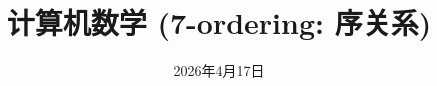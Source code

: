 \documentclass[a4paper, justified]{tufte-handout}
\title{计算机数学 (7-ordering: 序关系)}
\date{2026年4月17日}
\begin{document}
\maketitle
\noplagiarism %
\begin{abstract}
\end{abstract}
\beginrequired
\end{document}
